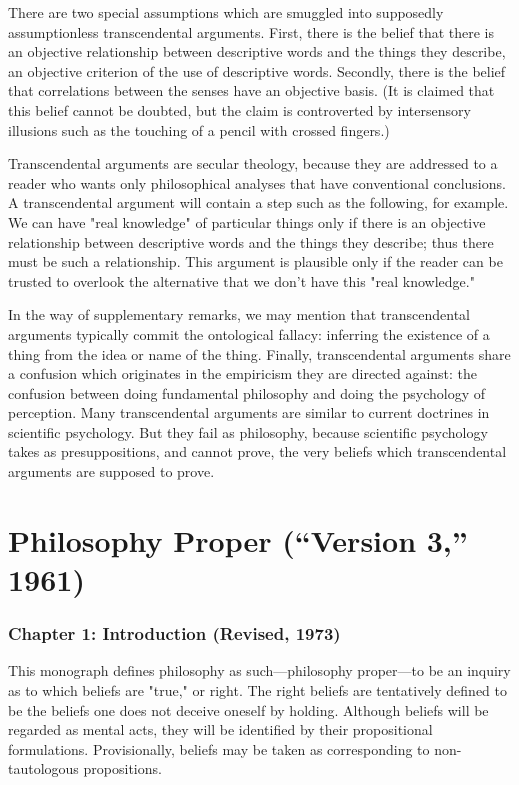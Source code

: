 \documentclass[10pt,twoside]{memoir}
\begin{document}
\begin{enumerate}
There are two special assumptions which are smuggled into supposedly 
assumptionless transcendental arguments. First, there is the belief that there 
is an objective relationship between descriptive words and the things they 
describe, an objective criterion of the use of descriptive words. Secondly, 
there is the belief that correlations between the senses have an objective 
basis. (It is claimed that this belief cannot be doubted, but the claim is 
controverted by intersensory illusions such as the touching of a pencil with 
crossed fingers.) 

Transcendental arguments are secular theology, because they are 
addressed to a reader who wants only philosophical analyses that have 
conventional conclusions. A transcendental argument will contain a step 
such as the following, for example. We can have "real knowledge" of 
particular things only if there is an objective relationship between descriptive 
words and the things they describe; thus there must be such a relationship. 
This argument is plausible only if the reader can be trusted to overlook the 
alternative that we don't have this "real knowledge." 

In the way of supplementary remarks, we may mention that 
transcendental arguments typically commit the ontological fallacy: inferring 
the existence of a thing from the idea or name of the thing. Finally, 
transcendental arguments share a confusion which originates in the 
empiricism they are directed against: the confusion between doing 
fundamental philosophy and doing the psychology of perception. Many 
transcendental arguments are similar to current doctrines in scientific 
psychology. But they fail as philosophy, because scientific psychology takes 
as presuppositions, and cannot prove, the very beliefs which transcendental 
arguments are supposed to prove. 

\chapter{Philosophy Proper (\enquote{Version 3,} 1961)}
\subsection*{Chapter 1: Introduction (Revised, 1973)}

This monograph defines philosophy as such---philosophy proper---to be 
an inquiry as to which beliefs are "true," or right. The right beliefs are 
tentatively defined to be the beliefs one does not deceive oneself by holding. 
Although beliefs will be regarded as mental acts, they will be identified by 
their propositional formulations. Provisionally, beliefs may be taken as 
corresponding to non-tautologous propositions. 


\end{enumerate}
\end{document}
